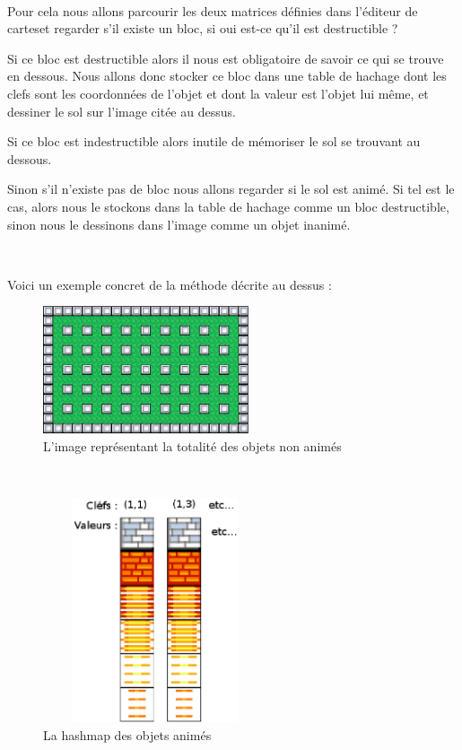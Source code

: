 			$\,$
			
			Pour cela nous allons parcourir les deux matrices définies dans l'éditeur de
			cartes\footnotemark[2] et regarder s'il existe un bloc, si oui est-ce
			qu'il est destructible ?
			
			Si ce bloc est destructible alors il nous est obligatoire de savoir ce qui se
			trouve en dessous.
			Nous allons donc stocker ce bloc dans une table de hachage dont les clefs sont les
			coordonnées de l'objet et dont la valeur est l'objet lui même, et dessiner le
			sol sur l'image citée au dessus.
			
			Si ce bloc est indestructible alors inutile de mémoriser le sol se trouvant
			au dessous.
			
			Sinon s'il n'existe pas de bloc nous allons regarder si le sol est animé. Si
			tel est le cas, alors nous le stockons dans la table de hachage comme un bloc
			destructible, sinon nous le dessinons dans l'image comme un objet inanimé.
			
			$\,$
			
			Voici un exemple concret de la méthode décrite au dessus :
				

			\begin{figure}[!h]			
				\begin{center}			
					\includegraphics[width=229px, height=142px]{Developpement/Img/map.eps}
					\caption{L'image représentant la totalité des objets non animés}
				\end{center}
			\end{figure}
			
			$\,$			

			\begin{figure}[!h]			
				\begin{center}						
					\includegraphics[width=250px, height=250px]{Developpement/Img/hashmap.eps}
					\caption{La hashmap des objets animés}
				\end{center}
			\end{figure}

